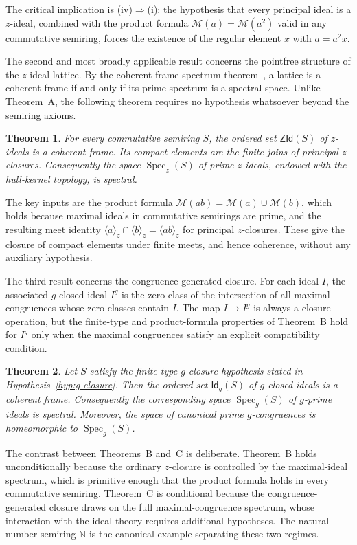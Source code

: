 \documentclass[11pt,leqno]{amsart}
\theoremstyle{plain}
\newtheorem{maintheorem}{Theorem}
\theoremstyle{definition}
\theoremstyle{remark}
\numberwithin{equation}{section}
\DeclareMathOperator{\Spec}{Spec}
\newcommand{\ZId}{\mathsf{ZId}}
\newcommand{\GCl}{\mathsf{Id}_{g}}
\newcommand{\M}{\mathcal M}
\newcommand{\ideal}[1]{\langle #1\rangle}
\newcommand{\N}{\mathds N}
\begin{document}
The critical implication is (iv)$\Rightarrow$(i):
the hypothesis that every principal ideal is a $z$-ideal,
combined with the product formula $\M(a)=\M(a^2)$ valid in any
commutative semiring, forces the existence of the regular element
$x$ with $a=a^2x$.

The second and most broadly applicable result concerns the
pointfree structure of the $z$-ideal lattice.
By the coherent-frame spectrum theorem~\cite{Hochster,Johnstone},
a lattice is a coherent frame if and only if its prime spectrum
is a spectral space.
Unlike Theorem~A, the following theorem requires no hypothesis whatsoever
beyond the semiring axioms.

\begin{maintheorem}\label{main:zframe}
For every commutative semiring $S$, the ordered set $\ZId(S)$ of
$z$-ideals is a coherent frame.
Its compact elements are the finite joins of principal $z$-closures.
Consequently the space $\Spec_z(S)$ of prime $z$-ideals,
endowed with the hull-kernel topology, is spectral.
\end{maintheorem}

The key inputs are the product formula $\M(ab)=\M(a)\cup\M(b)$,
which holds because maximal ideals in commutative semirings are prime,
and the resulting meet identity $\ideal{a}_z\cap\ideal{b}_z=\ideal{ab}_z$
for principal $z$-closures.
These give the closure of compact elements under finite meets,
and hence coherence, without any auxiliary hypothesis.

The third result concerns the congruence-generated closure.
For each ideal $I$, the associated $g$-closed ideal
$I^g$ is the zero-class of the intersection of all maximal
congruences whose zero-classes contain $I$.
The map $I\mapsto I^g$ is always a closure operation, but the
finite-type and product-formula properties of Theorem~B hold
for $I^g$ only when the maximal congruences satisfy an explicit
compatibility condition.

\begin{maintheorem}\label{main:gframe}
Let $S$ satisfy the finite-type $g$-closure hypothesis stated in
Hypothesis~\ref{hyp:g-closure}.  Then the ordered set $\GCl(S)$
of $g$-closed ideals is a coherent frame.
Consequently the corresponding space $\Spec_g(S)$ of $g$-prime ideals
is spectral.  Moreover, the space of canonical prime $g$-congruences
is homeomorphic to $\Spec_g(S)$.
\end{maintheorem}

The contrast between Theorems~B and~C is deliberate.
Theorem~B holds unconditionally because the ordinary $z$-closure
is controlled by the maximal-ideal spectrum, which is primitive
enough that the product formula holds in every commutative semiring.
Theorem~C is conditional because the congruence-generated closure
draws on the full maximal-congruence spectrum, whose interaction
with the ideal theory requires additional hypotheses.
The natural-number semiring $\N$ is the canonical example
separating these two regimes.
\end{document}

